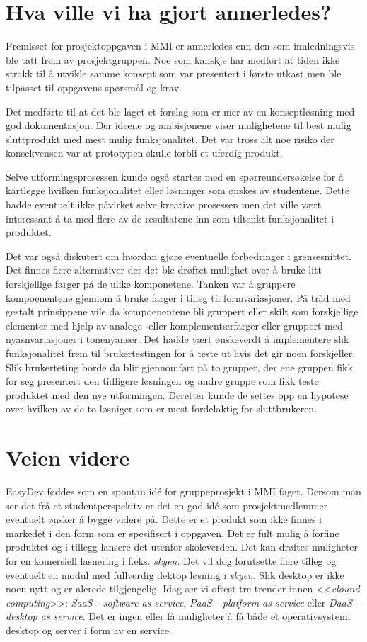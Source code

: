\section{Hva ville vi ha gjort annerledes?}
Premisset for prosjektoppgaven i MMI er annerledes enn den som innledningsvis ble tatt frem av prosjektgruppen.
Noe som kanskje har medført at tiden ikke strakk til å utvikle samme konsept som var presentert i første utkast men ble tilpasset til oppgavens spørsmål og krav.

Det medførte til at det ble laget et forslag som er mer av en konseptløsning med god dokumentasjon. Der ideene og ambisjonene viser mulighetene til best mulig sluttprodukt med mest mulig funksjonalitet. 
Det var tross alt noe risiko der konsekvensen var at prototypen skulle forbli et uferdig produkt.

Selve utformingsprosessen kunde også startes med en spørreundersøkelse for å kartlegge hvilken funksjonalitet eller løsninger som ønskes av studentene. 
Dette hadde eventuelt ikke påvirket selve kreative prosessen men det ville vært interessant å ta med flere av de resultatene inn som tiltenkt funksjonalitet i produktet.

Det var også diskutert om hvordan gjøre eventuelle forbedringer i grensesnittet. Det finnes flere alternativer der det ble drøftet mulighet over å bruke litt forskjellige farger på de ulike komponetene. 
Tanken var å gruppere kompoenentene gjennom å bruke farger i tilleg til formvariasjoner. 
På tråd med gestalt prinsippene vile da kompoenentene bli gruppert eller skilt som forskjellige elementer med hjelp av analoge- eller komplementærfarger eller gruppert med nyasnvariasjoner i tonenyanser. 
Det hadde vært ønskeverdt å implementere slik funksjonalitet frem til brukertestingen for å teste ut hvis det gir noen forskjeller.
Slik brukerteting borde da blir gjennomført på to grupper, der ene gruppen fikk for seg presentert den tidligere løsningen og andre gruppe som fikk teste produktet med den nye utformingen. Deretter kunde de settes opp en hypotese over hvilken av de to løsniger som er mest fordelaktig for sluttbrukeren.

\section{Veien videre}
EasyDev føddes som en spontan idé for gruppeprosjekt i MMI faget. 
Dersom man ser det frå et studentperspekitv er det en god idé som prosjektmedlemmer eventuelt ønsker å bygge videre på. 
Dette er et produkt som ikke finnes i markedet i den form som er spesifisert i oppgaven. 
Det er fult mulig å forfine produktet og i tillegg lansere det utenfor skoleverden. 
Det kan drøftes muligheter for en komersiell lasnering i f.eks. \textit{skyen}. 
Det vil dog forutsette flere tilleg og eventuelt en modul med fullverdig dektop løsning i \textit{skyen}. 
Slik desktop er ikke noen nytt og er alerede tilgjengelig. 
Idag ser vi oftest tre trender innen <<\textit{clound computing}>>: \textit{SaaS - software as service}, \textit{PaaS - platform as service} eller \textit{DaaS - desktop as service}. 
Det er ingen eller få muligheter å få både et operativsystem, desktop og server i form av en service. 

